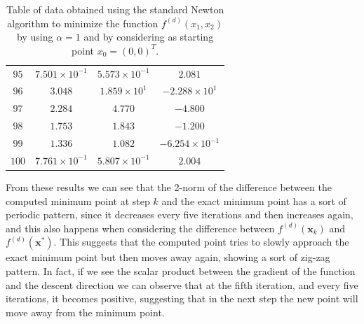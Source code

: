 \documentclass[a4paper,11pt]{article}
\begin{document}
\begin{table}
\begin{tabular}{|c|c|c|c|}
		$95$ & $7.501\times10^{-1}$ & $5.573\times10^{-1}$ & $2.081$ \\
		$96$ & $3.048$ & $1.859\times10^{1}$ & $-2.288\times10^{1}$ \\
		$97$ & $2.284$ & $4.770$ & $-4.800$ \\
		$98$ & $1.753$ & $1.843$ & $-1.200$ \\
		$99$ & $1.336$ & $1.082$ & $-6.254\times10^{-1}$ \\
		$100$ & $7.761\times10^{-1}$ & $5.807\times10^{-1}$ & $2.004$ \\
		\hline
	\end{tabular}
	\caption{Table of data obtained using the standard Newton algorithm to minimize the function $f^{(d)}(x_{1},x_{2})$ by using $\alpha=1$ and by considering as starting point $x_{0}=(0,0)^{T}$.}
	\label{tab:func_d_x0_2}
\end{table}
From these results we can see that the 2-norm of the difference between the computed minimum point at step $k$ and the exact minimum point has a sort of periodic pattern, since it decreases every five iterations and then increases again, and this also happens when considering the difference between $f^{(d)}(\textbf{x}_{k})$ and  $f^{(d)}(\textbf{x}^*)$. This suggests that the computed point tries to slowly approach the exact minimum point but then moves away again, showing a sort of zig-zag pattern. In fact, if we see the scalar product between the gradient of the function and the descent direction we can observe that at the fifth iteration, and every five iterations, it becomes positive, suggesting that in the next step the new point will move away from the minimum point.\\
\end{document}
